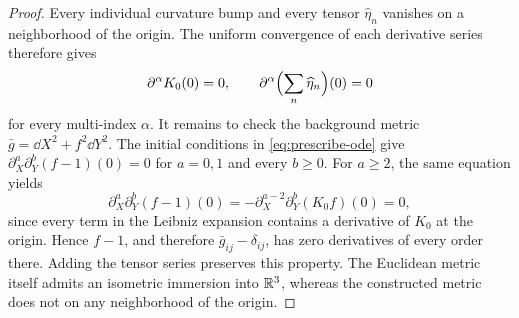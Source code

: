 \begin{proof}
Every individual curvature bump and every tensor
\(\widehat\eta_n\) vanishes on a neighborhood of the origin.
The uniform convergence of each derivative series therefore gives
\[
\partial^\alpha K_0(0)=0,
\qquad
\partial^\alpha\Bigl(\sum_n\widehat\eta_n\Bigr)(0)=0
\]
for every multi-index \(\alpha\).
It remains to check the background metric
\(\bar g=\dd X^2+f^2\dd Y^2\).
The initial conditions in \eqref{eq:prescribe-ode} give
\(\partial_X^a\partial_Y^b(f-1)(0)=0\) for \(a=0,1\)
and every \(b\ge0\). For \(a\ge2\), the same equation yields
\[
\partial_X^a\partial_Y^b(f-1)(0)
=-\partial_X^{a-2}\partial_Y^b(K_0f)(0)=0,
\]
since every term in the Leibniz expansion contains a derivative
of \(K_0\) at the origin. Hence \(f-1\), and therefore
\(\bar g_{ij}-\delta_{ij}\), has zero derivatives of every order
there. Adding the tensor series preserves this property.
The Euclidean metric itself admits an isometric immersion into
\(\mathbb R^3\), whereas the constructed metric does not on any
neighborhood of the origin.
\end{proof}
